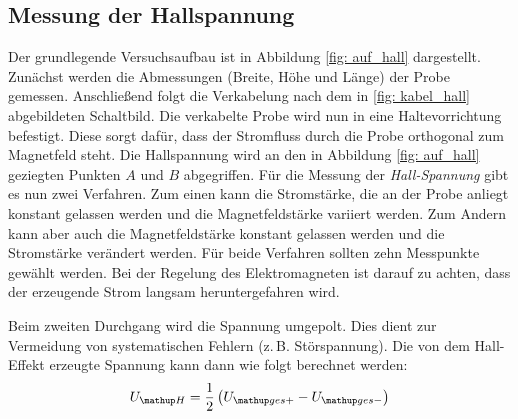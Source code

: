 \subsection{Messung der Hallspannung}
Der grundlegende Versuchsaufbau ist in Abbildung \ref{fig: auf_hall} dargestellt.
Zunächst werden die Abmessungen (Breite, Höhe und Länge) der Probe gemessen.
Anschließend folgt die Verkabelung nach dem in \ref{fig: kabel_hall} abgebildeten Schaltbild.
Die verkabelte Probe wird nun in eine Haltevorrichtung befestigt. Diese sorgt dafür, dass %
der Stromfluss durch die Probe orthogonal zum Magnetfeld steht.
Die Hallspannung wird an den in Abbildung \ref{fig: auf_hall} geziegten Punkten $A$ und $B$ abgegriffen.
Für die Messung der \emph{Hall-Spannung} gibt es nun zwei Verfahren.
Zum einen kann die Stromstärke, die an der Probe anliegt konstant gelassen werden und
die Magnetfeldstärke variiert werden. Zum Andern kann
aber auch die Magnetfeldstärke konstant gelassen werden und die Stromstärke verändert
werden. Für beide Verfahren sollten zehn Messpunkte gewählt werden.
Bei der Regelung des Elektromagneten ist darauf zu achten, dass der
erzeugende Strom langsam heruntergefahren wird.

Beim zweiten Durchgang wird die Spannung umgepolt. %
Dies dient zur Vermeidung von systematischen Fehlern (z.\,B. Störspannung).
Die von dem Hall-Effekt erzeugte Spannung kann dann wie folgt berechnet werden: %
\begin{equation} %
\label{eq:hall_spann}
U\ua{H}=\frac{1}{2}\left(U\ua{ges+}-U\ua{ges-}\right)
\end{equation}

